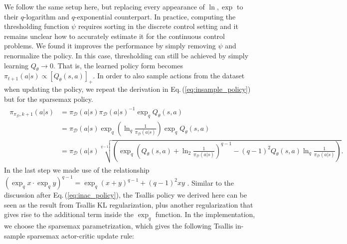 \documentclass{article}
\newcommand{\AdaBracket}[1]{\left(#1\right)}
\newcommand{\AdaRectBracket}[1]{\left[#1\right]}
\newcommand{\qlog}{$q$-logarithm }
\newcommand{\expq}[1]{\exp_{q}\!#1}
\newcommand{\eq}[1]{Eq.\,(#1)}
\newcommand{\datasetPolicy}{\pi_{\mathcal{D}}}
\begin{document}
We follow the same setup here, but replacing every appearance of $\ln, \exp$ to their \qlog and $q$-exponential counterpart.
In practice, computing the thresholding function $\psi$ requires sorting in the discrete control setting and it remains unclear how to accurately estimate it for the continuous control problems.
We found it improves the performance by simply removing $\psi$ and renormalize the policy.
In this case, thresholding can still be achieved by simply learning $Q_{\theta} \rightarrow 0$.
That is, the learned policy form becomes $\pi_{t+1}(a|s) \propto \AdaRectBracket{Q_{\theta}(s,a)}_{+}$.
In order to also sample actions from the dataset when updating the policy, we repeat the derivation in \eq{\ref{eq:insample_policy}} but for the sparsemax policy.
\begin{align}
    \begin{split}
        \pi_{\datasetPolicy, k+1} (a|s) &= \datasetPolicy(a|s) \datasetPolicy(a|s)^{-1} \exp_q{Q_{\theta}(s,a)} \\
        &= \datasetPolicy(a|s)  \exp_q{\AdaBracket{\ln_q{\frac{1}{\datasetPolicy(a|s)}}}} \exp_q{Q_{\theta}(s,a)}\\
        &=  \datasetPolicy(a|s) \sqrt[q-1]{\AdaBracket{ \exp_q\AdaBracket{Q_{\theta}(s,a) + \ln_2\frac{1}{\datasetPolicy(a|s)}}^{q-1} - (q-1)^2 Q_{\theta}(s,a)  \ln_q{\frac{1}{\datasetPolicy(a|s)}} }}.
        \label{eq:tsallis_inac_policy}
    \end{split}
\end{align}
In the last step we made use of the relationship $\AdaBracket{\expq{x}\cdot \expq{y}}^{q-1} = \expq{\AdaBracket{x+y}}^{q-1} + (q-1)^2 xy$ \cite{Yamano2004-properties-qlogexp}.
Similar to the discussion after \eq{\ref{eq:inac_policy}}, the Tsallis policy we derived here can be seen as the result from Tsallis KL regularization, plus another regularization that gives rise to the additional term inside the $\exp_q$ function.
In the implementation, we choose the sparsemax parametrization, which gives the following Tsallis in-sample sparsemax actor-critic update rule:
\end{document}

